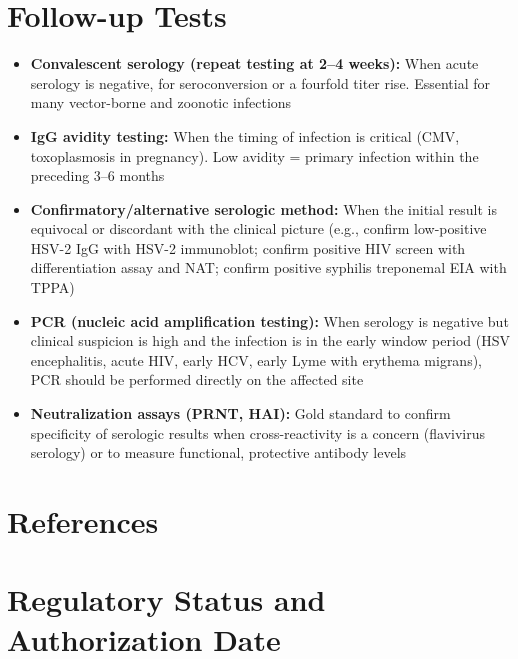 \section*{Follow-up Tests}
\begin{itemize}
  \item \textbf{Convalescent serology (repeat testing at 2--4 weeks):} When acute serology is negative, for seroconversion or a fourfold titer rise. Essential for many vector-borne and zoonotic infections
  \item \textbf{IgG avidity testing:} When the timing of infection is critical (CMV, toxoplasmosis in pregnancy). Low avidity = primary infection within the preceding 3--6 months
  \item \textbf{Confirmatory/alternative serologic method:} When the initial result is equivocal or discordant with the clinical picture (e.g., confirm low-positive HSV-2 IgG with HSV-2 immunoblot; confirm positive HIV screen with differentiation assay and NAT; confirm positive syphilis treponemal EIA with TPPA)
  \item \textbf{PCR (nucleic acid amplification testing):} When serology is negative but clinical suspicion is high and the infection is in the early window period (HSV encephalitis, acute HIV, early HCV, early Lyme with erythema migrans), PCR should be performed directly on the affected site
  \item \textbf{Neutralization assays (PRNT, HAI):} Gold standard to confirm specificity of serologic results when cross-reactivity is a concern (flavivirus serology) or to measure functional, protective antibody levels
\end{itemize}

\section*{References}



\clearpage
\section*{Regulatory Status and Authorization Date}

\clearpage
